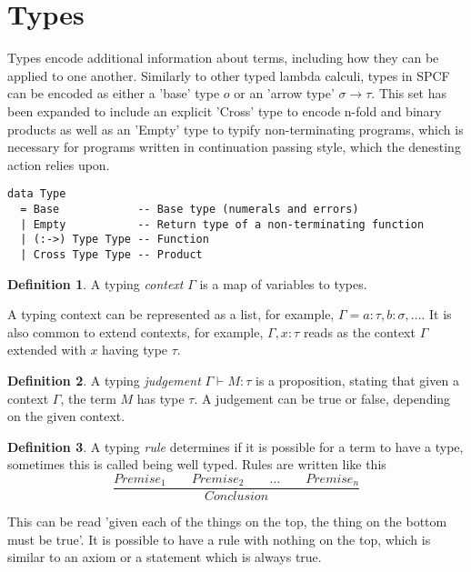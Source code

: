 \documentclass[12pt,a4paper]{report}
\theoremstyle{definition}
\newtheorem{definition}{Definition}[chapter]%
\theoremstyle{remark}
\begin{document}
\section{Types}\label{section: typing}
Types encode additional information about terms, including how they can be applied to one another. Similarly to other typed lambda calculi, types in SPCF can be encoded as either a 'base' type $o$ or an 'arrow type' $\sigma \rightarrow \tau$. This set has been expanded to include an explicit 'Cross' type to encode n-fold and binary products as well as an 'Empty' type to typify non-terminating programs, which is necessary for programs written in continuation passing style, which the denesting action relies upon.

\begin{listing}
\caption{SPCF inductive definition for types using an ADT}
\begin{verbatim}
data Type
  = Base            -- Base type (numerals and errors)
  | Empty           -- Return type of a non-terminating function
  | (:->) Type Type -- Function
  | Cross Type Type -- Product
\end{verbatim}
\label{listing:type-adt}
\end{listing}

\begin{definition}
    A typing \emph{context} $\Gamma$ is a map of variables to types.
\end{definition}

A typing context can be represented as a list, for example, $\Gamma = a:\tau, b:\sigma, \ldots$. It is also common to extend contexts, for example, $\Gamma, x:\tau$ reads as the context $\Gamma$ extended with $x$ having type $\tau$. 

\begin{definition}
    A typing \emph{judgement} $\Gamma \vdash M:\tau$ is a proposition, stating that given a context $\Gamma$, the term $M$ has type $\tau$. A judgement can be true or false, depending on the given context.
\end{definition}

\begin{definition}
    A typing \emph{rule} determines if it is possible for a term to have a type, sometimes this is called being well typed. Rules are written like this
    \[
    \frac{Premise_1 \quad\quad Premise_2 \quad\quad \ldots \quad\quad Premise_n}{Conclusion}
    \]

    This can be read 'given each of the things on the top, the thing on the bottom must be true'. It is possible to have a rule with nothing on the top, which is similar to an axiom or a statement which is always true.
\end{definition}
\end{document}
